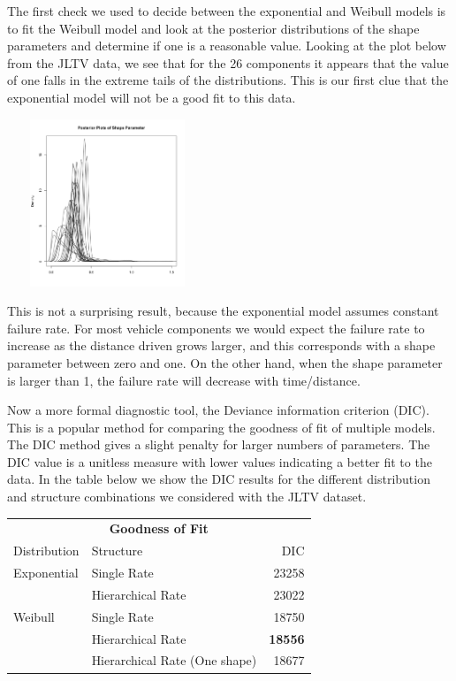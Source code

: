 \documentclass[12pt]{article}
\begin{document}
The first check we used to decide between the exponential and Weibull models is
to fit the Weibull model and look at the posterior distributions of the
shape parameters and determine if one is a reasonable value.  Looking at the
plot below from the JLTV data, we see that for the 26 components it appears
that the value of one falls in the extreme tails of the distributions.  This is
our first clue that the exponential model will not be a good fit to this data.

\includegraphics[width=6cm, height=5cm]{betaPostPlot}

This is not a surprising result, because the exponential model assumes constant
failure rate.  For most vehicle components we would expect the failure rate to
increase as the distance driven grows larger, and this corresponds with a shape
parameter between zero and one.  On the other hand, when the shape parameter is
larger than 1, the failure rate will decrease with time/distance.

Now a more formal diagnostic tool, the Deviance information criterion (DIC).
This is a popular method for comparing the goodness of fit of multiple models.
The DIC method gives a slight penalty for larger numbers of parameters.  The DIC
value is a unitless measure with lower values indicating a better fit to the
data.  In the table below we show the DIC results for the different distribution
and structure combinations we considered with the JLTV dataset.

\begin{tabular}{|l|l|r|}
\multicolumn{3}{c}{\textbf{Goodness of Fit}} \\
\cline{1-3}
Distribution    & Structure & DIC \\
\hline
Exponential   & Single Rate                       & 23258               \\
              & Hierarchical Rate                 & 23022               \\
Weibull       & Single Rate                       & 18750               \\
              & Hierarchical Rate                 & \textbf{18556}      \\
              & Hierarchical Rate (One shape)     & 18677               \\
\hline
\end{tabular}
\end{document}
